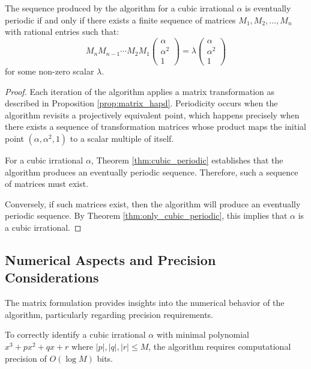 \begin{theorem}\label{thm:matrix_periodicity}
The sequence produced by the \HAPD{} algorithm for a cubic irrational $\alpha$ is eventually periodic if and only if there exists a finite sequence of matrices $M_1, M_2, \ldots, M_n$ with rational entries such that:
\begin{equation}
M_n M_{n-1} \cdots M_2 M_1 \begin{pmatrix} \alpha \\ \alpha^2 \\ 1 \end{pmatrix} = \lambda \begin{pmatrix} \alpha \\ \alpha^2 \\ 1 \end{pmatrix}
\end{equation}
for some non-zero scalar $\lambda$.
\end{theorem}

\begin{proof}
Each iteration of the \HAPD{} algorithm applies a matrix transformation as described in Proposition \ref{prop:matrix_hapd}. Periodicity occurs when the algorithm revisits a projectively equivalent point, which happens precisely when there exists a sequence of transformation matrices whose product maps the initial point $(\alpha, \alpha^2, 1)$ to a scalar multiple of itself.

For a cubic irrational $\alpha$, Theorem \ref{thm:cubic_periodic} establishes that the \HAPD{} algorithm produces an eventually periodic sequence. Therefore, such a sequence of matrices must exist.

Conversely, if such matrices exist, then the \HAPD{} algorithm will produce an eventually periodic sequence. By Theorem \ref{thm:only_cubic_periodic}, this implies that $\alpha$ is a cubic irrational.
\end{proof}

\subsection{Numerical Aspects and Precision Considerations}

The matrix formulation provides insights into the numerical behavior of the \HAPD{} algorithm, particularly regarding precision requirements.

\begin{proposition}\label{prop:precision}
To correctly identify a cubic irrational $\alpha$ with minimal polynomial $x^3 + px^2 + qx + r$ where $|p|, |q|, |r| \leq M$, the \HAPD{} algorithm requires computational precision of $O(\log M)$ bits.
\end{proposition}

